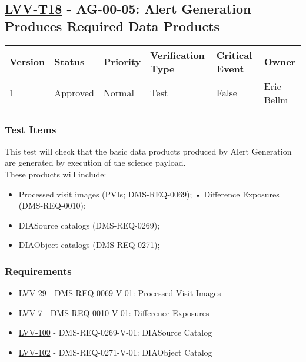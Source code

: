 \hypertarget{lvv-t18---ag-00-05-alert-generation-produces-required-data-products}{\subsection{\texorpdfstring{\href{https://jira.lsstcorp.org/secure/Tests.jspa\#/testCase/LVV-T18}{LVV-T18}
- AG-00-05: Alert Generation Produces Required Data
Products}{LVV-T18 - AG-00-05: Alert Generation Produces Required Data Products}}\label{lvv-t18---ag-00-05-alert-generation-produces-required-data-products}}

\begin{longtable}[]{@{}llllll@{}}
\toprule
Version & Status & Priority & Verification Type & Critical Event &
Owner\tabularnewline
\midrule
\endhead
1 & Approved & Normal & Test & False & Eric Bellm\tabularnewline
\bottomrule
\end{longtable}

\subsubsection{Test Items}\label{test-items-1}

This test will check that the basic data products produced by Alert
Generation are generated by execution of the science payload.\\
These products will include:

\begin{itemize}
\tightlist
\item
  Processed visit images (PVIs; DMS-REQ-0069); • Difference Exposures
  (DMS-REQ-0010);
\item
  DIASource catalogs (DMS-REQ-0269);
\item
  DIAObject catalogs (DMS-REQ-0271);
\end{itemize}

\subsubsection{Requirements}\label{requirements-1}

\begin{itemize}
\tightlist
\item
  \href{https://jira.lsstcorp.org/browse/LVV-29}{LVV-29} -
  DMS-REQ-0069-V-01: Processed Visit Images
\item
  \href{https://jira.lsstcorp.org/browse/LVV-7}{LVV-7} -
  DMS-REQ-0010-V-01: Difference Exposures
\item
  \href{https://jira.lsstcorp.org/browse/LVV-100}{LVV-100} -
  DMS-REQ-0269-V-01: DIASource Catalog
\item
  \href{https://jira.lsstcorp.org/browse/LVV-102}{LVV-102} -
  DMS-REQ-0271-V-01: DIAObject Catalog
\end{itemize}

